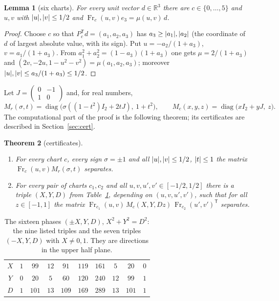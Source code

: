 \documentclass[11pt]{article}
\newtheorem{theorem}{Theorem}[section]
\newtheorem{lemma}[theorem]{Lemma}
\theoremstyle{definition}
\theoremstyle{remark}
\newcommand{\R}{\mathbb{R}}
\newcommand{\Fr}{\operatorname{Fr}}
\newcommand{\diag}{\operatorname{diag}}
\newcommand{\T}{\mathsf T}
\DeclarePairedDelimiter{\abs}{\lvert}{\rvert}
\begin{document}
\begin{lemma}[six charts]\label{lem:cover}
For every unit vector $d\in\R^3$ there are $c\in\{0,\dots,5\}$ and $u,v$ with $\abs u,\abs v\le1/2$
and $\Fr_c(u,v)e_3=\mu(u,v)\,d$.
\end{lemma}

\begin{proof}
Choose $c$ so that $P_c^{\T}d=(a_1,a_2,a_3)$ has $a_3\ge\abs{a_1},\abs{a_2}$ (the coordinate of $d$ of
largest absolute value, with its sign). Put $u=-a_2/(1+a_3)$, $v=a_1/(1+a_3)$. From
$a_1^2+a_2^2=(1-a_3)(1+a_3)$ one gets $\mu=2/(1+a_3)$ and $(2v,-2u,1-u^2-v^2)=\mu(a_1,a_2,a_3)$;
moreover $\abs u,\abs v\le a_3/(1+a_3)\le1/2$.
\end{proof}

Let $J=\left(\begin{smallmatrix}0&-1\\1&0\end{smallmatrix}\right)$ and, for real numbers,
\[
  M_r(\sigma,t)=\diag\bigl(\sigma((1-t^2)I_2+2tJ),\ 1+t^2\bigr),\qquad
  M_c(x,y,z)=\diag\bigl(xI_2+yJ,\ z\bigr).
\]
The computational part of the proof is the following theorem; its certificates are described in
Section~\ref{sec:cert}.

\begin{theorem}[certificates]\label{thm:cert}
\begin{enumerate}
\item[\textup{(R)}] For every chart $c$, every sign $\sigma=\pm1$ and all $\abs u,\abs v\le1/2$,
  $\abs t\le1$ the matrix $\Fr_c(u,v)M_r(\sigma,t)$ separates.
\item[\textup{(C)}] For every pair of charts $c_1,c_2$ and all $u,v,u',v'\in[-1/2,1/2]$ there is a triple
  $(X,Y,D)$ from Table~\ref{tab:phases}, depending on $(u,v,u',v')$, such that for all
  $z\in[-1,1]$ the matrix $\Fr_{c_1}(u,v)\,M_c(X,Y,Dz)\,\Fr_{c_2}(u',v')^{\T}$ separates.
\end{enumerate}
\end{theorem}

\begin{table}[ht]
\centering
\begin{tabular}{c|ccccccccc}
\toprule
$X$ & $1$ & $99$ & $12$ & $91$ & $119$ & $161$ & $5$ & $20$ & $0$\\
$Y$ & $0$ & $20$ & $5$ & $60$ & $120$ & $240$ & $12$ & $99$ & $1$\\
$D$ & $1$ & $101$ & $13$ & $109$ & $169$ & $289$ & $13$ & $101$ & $1$\\
\bottomrule
\end{tabular}
\caption{The sixteen phases $(\pm X,Y,D)$, $X^2+Y^2=D^2$: the nine listed triples and the seven
triples $(-X,Y,D)$ with $X\neq0,1$. They are directions in the upper half plane.}
\label{tab:phases}
\end{table}
\end{document}
